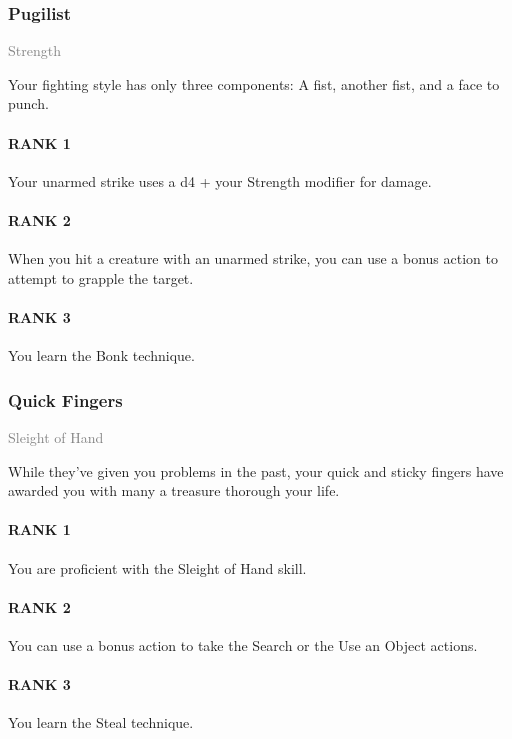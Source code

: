 \subsubsection{Pugilist} \label{feat::pugilist}
\small{\textcolor{gray}{Strength}}

\normalsize
Your fighting style has only three components:
A fist, another fist, and a face to punch.
\paragraph{RANK 1} Your unarmed strike uses a d4 + your Strength modifier for damage.
\paragraph{RANK 2} When you hit a creature with an unarmed strike, you can use a bonus action to attempt to grapple the target.
\paragraph{RANK 3} You learn the Bonk technique.

\subsubsection{Quick Fingers} \label{feat::quickfingers}
\small{\textcolor{gray}{Sleight of Hand}}

\normalsize
While they've given you problems in the past, your quick and sticky fingers have awarded you with many a treasure thorough your life.
\paragraph{RANK 1} You are proficient with the Sleight of Hand skill.
\paragraph{RANK 2} You can use a bonus action to take the Search or the Use an Object actions.
\paragraph{RANK 3} You learn the Steal technique.

